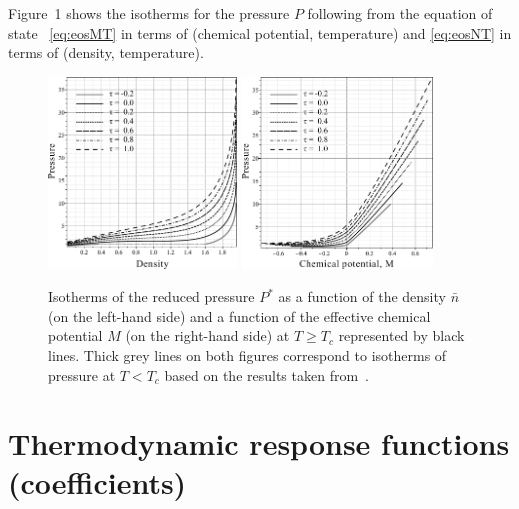 \documentclass[12pt]{article}
\begin{document}
	Figure~1 shows the isotherms for the pressure $P$ following from the equation of state ~\eqref{eq:eosMT} in terms of (chemical potential, temperature)  and \eqref{eq:eosNT} in terms of (density, temperature).
	\begin{figure}[h!]
		\includegraphics[width=0.446\textwidth]{f1a1.pdf} 
		\includegraphics[width=0.45\textwidth]{f1b1.pdf} 
		\vskip-3mm\caption{Isotherms of the reduced pressure $P^*$ as a function of the density $\bar n$ (on the left-hand side) and a function of the effective chemical potential $M$ (on the right-hand side) at $T \geq T_c$ represented by black lines. Thick grey lines on both figures correspond to isotherms of pressure at $T < T_c$ based on the results taken from~\cite{KozlovskiiDobush2020}. 
		}\label{fig1}
	\end{figure}
	
	\section{Thermodynamic response functions (coefficients)}
	
\end{document}

